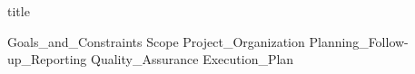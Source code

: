 \documentclass{article}
\begin{document}
{title}

\frontmatter

\tableofcontents

\listoffigures
\listoftables

\mainmatter

{Goals_and_Constraints}
{Scope}
{Project_Organization}
{Planning_Follow-up_Reporting}
{Quality_Assurance}
{Execution_Plan}

\addappendix


\newpage
\printbibliography[heading = bibintoc, title = Bibliography]

\end{document}
